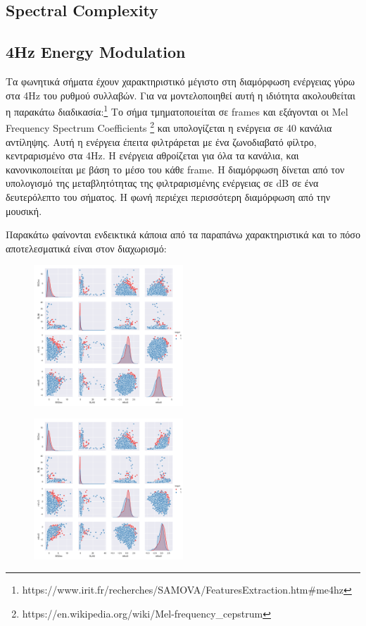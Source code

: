\subsection{Spectral Complexity}




\subsection{4Hz Energy Modulation}

Τα φωνητικά σήματα έχουν χαρακτηριστικό μέγιστο στη διαμόρφωση ενέργειας γύρω στα 4Hz του ρυθμού συλλαβών. Για να μοντελοποιηθεί αυτή η ιδιότητα ακολουθείται η παρακάτω διαδικασία:\footnote{https://www.irit.fr/recherches/SAMOVA/FeaturesExtraction.htm\#me4hz} Το σήμα τμηματοποιείται σε frames και εξάγονται οι Mel Frequency Spectrum Coefficients \footnote{https://en.wikipedia.org/wiki/Mel-frequency\_cepstrum} και υπολογίζεται η ενέργεια σε 40 κανάλια αντίληψης. Αυτή η ενέργεια έπειτα φιλτράρεται με ένα ζωνοδιαβατό φίλτρο, κεντραρισμένο στα 4Hz. Η ενέργεια αθροίζεται για όλα τα κανάλια, και κανονικοποιείται με βάση το μέσο του κάθε frame. Η διαμόρφωση δίνεται από τον υπολογισμό της μεταβλητότητας της φιλτραρισμένης ενέργειας σε dB σε ένα δευτερόλεπτο του σήματος. Η φωνή περιέχει περισσότερη διαμόρφωση από την μουσική.


Παρακάτω φαίνονται ενδεικτικά κάποια από τα παραπάνω χαρακτηριστικά και το πόσο αποτελεσματικά είναι στον διαχωρισμό:

\begin{figure}[H]
\centering
\includegraphics[width=0.5\textwidth]{figure_1.png}
\end{figure}
\begin{figure}[H]
\centering
\includegraphics[width=0.5\textwidth]{figure_2.png}
\end{figure}


